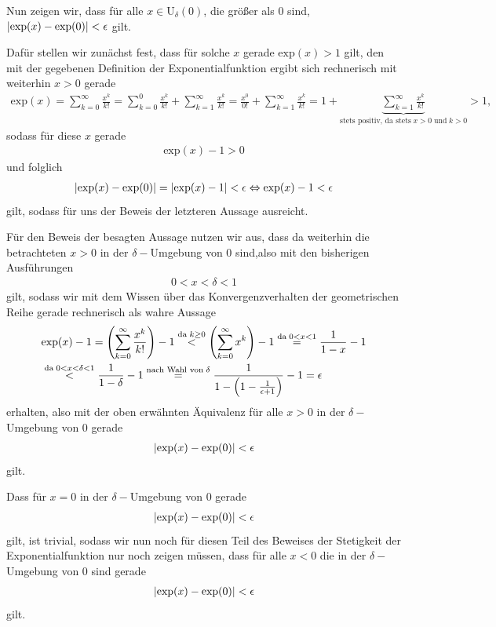 \begin{lsg}
\begin{enumerate}[label=$\mathrm{(\roman*)}$, ref=$\mathrm{\roman*}$]
 Nun zeigen wir, dass für alle $x\in \textrm{U}_\delta(0)$, die größer als $0$ 
sind,
 $|\textrm{exp}(x)-\textrm{exp}(0)|<\epsilon$ gilt.
 
 Dafür stellen wir zunächst fest, dass für solche $x$ gerade $\textrm{exp}(x)>1$ 
gilt, den mit der gegebenen Definition der Exponentialfunktion ergibt sich 
rechnerisch mit weiterhin $x>0$ gerade
 \begin{align*}
  \textrm{exp}(x)= \sum_{k=0}^\infty \frac{x^k}{k!}= \sum_{k=0}^0 
\frac{x^k}{k!}+ \sum_{k=1}^\infty \frac{x^k}{k!}= 
\frac{x^0}{0!}+\sum_{k=1}^\infty \frac{x^k}{k!}= 1+\underbrace{\sum_{k=1}^\infty 
\frac{x^k}{k!}}_{\textrm{stets positiv, da stets}\; x>0 \; \textrm{und}\; k>0 
}>1,
 \end{align*} sodass für diese $x$ gerade
 \begin{align*}
  \textrm{exp}(x)-1>0
 \end{align*}
 und folglich\begin{align*}
  |\textrm{exp}(x)-\textrm{exp}(0)|= |\textrm{exp}(x)-1|<\epsilon \Leftrightarrow 
\textrm{exp}(x)-1<\epsilon
 \end{align*} gilt, sodass für uns der Beweis der letzteren Aussage ausreicht.
 
Für den Beweis der besagten Aussage nutzen wir aus, dass da weiterhin die 
betrachteten $x>0$ in der $\delta-$Umgebung von $0$ sind,also  mit den 
bisherigen Ausführungen
\begin{align*}
 0<x<\delta<1
\end{align*} gilt, sodass wir mit dem Wissen über das Konvergenzverhalten der 
geometrischen Reihe gerade rechnerisch als wahre Aussage
\begin{align*}
  &\textrm{exp}(x)-1= \left(\sum_{k=0}^\infty \frac{x^k}{k!} \right)-1 
\stackrel{\textrm{da} \; k \geq0}{<} \left(\sum_{k=0}^\infty x^k \right)-1 
\stackrel{\textrm{da} \; 0< x< 1}{=} \frac{1}{1-x}-1\\ &\stackrel{\textrm{da} \; 
0< x< \delta< 1}{<} \frac{1}{1-\delta} -1\stackrel{\textrm{nach Wahl von} \; 
\delta}{=} \frac{1}{1-\left(1-\frac{1}{\epsilon+1}\right)}-1 = \epsilon
 \end{align*}
erhalten, also mit der oben erwähnten Äquivalenz für alle $x>0$ in der 
$\delta-$Umgebung von $0$ gerade
\begin{align*}
  |\textrm{exp}(x)-\textrm{exp}(0)|<\epsilon
 \end{align*}
gilt.

Dass für $x=0$ in der $\delta-$Umgebung von $0$ gerade
\begin{align*}
  |\textrm{exp}(x)-\textrm{exp}(0)|<\epsilon
 \end{align*}
gilt, ist trivial, sodass wir nun noch für diesen Teil des Beweises der 
Stetigkeit der Exponentialfunktion nur noch zeigen müssen, dass für alle $x<0$ 
die in der $\delta-$Umgebung von $0$ sind gerade
\begin{align*}
  |\textrm{exp}(x)-\textrm{exp}(0)|<\epsilon
 \end{align*}
gilt.


\end{enumerate}
\end{lsg}
